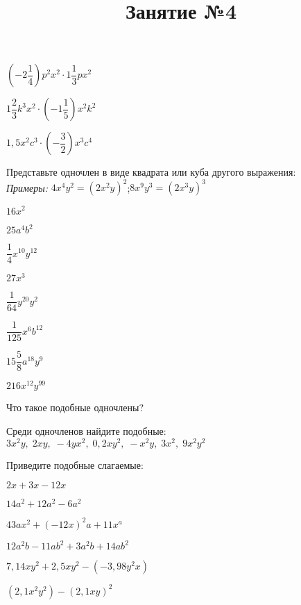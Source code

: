 \begin{listofex}
\begin{enumcols}[itemcolumns=2]
		\item \( \left( -2\dfrac{1}{4} \right)p^2x^2\cdot1\dfrac{1}{3}px^2 \)
		\item \( 1\dfrac{2}{3}k^3x^2\cdot\left( -1\dfrac{1}{5} \right)x^2k^2 \)
		\item \( 1,5x^2c^3\cdot\left( -\dfrac{3}{2} \right)x^3c^4 \)
	\end{enumcols}
	\item Представьте одночлен в виде квадрата или куба другого выражения:\\
	\textit{Примеры:} \( 4x^4y^2=(2x^2y)^2 \);\quad\( 8x^9y^3=(2x^3y)^3 \)
	\begin{enumcols}[itemcolumns=4]
		\item \( 16x^2 \)
		\item \( 25a^4b^2 \)
		\item \( \dfrac{1}{4}x^{10}y^{12} \)
		\item \( 27x^3 \)
		\item \( \dfrac{1}{64}y^{20}y^2 \)
		\item \( \dfrac{1}{125}x^6b^{12} \)
		\item \( 15\dfrac{5}{8}a^{18}y^9 \)
		\item \( 216x^{12}y^{99} \)
	\end{enumcols}
	\item Что такое подобные одночлены?
	\item Среди одночленов найдите подобные:\quad \( 3x^2y,\;2xy,\;-4yx^2,\;0,2xy^2,\;-x^2y,\;3x^2,\;9x^2y^2 \)
	\item Приведите подобные слагаемые:
	\begin{enumcols}[itemcolumns=2]
		\item \( 2x+3x-12x \)
		\item \( 14a^2+12a^2-6a^2 \)
		\item \( 43ax^2+(-12x)^2a+11x^a \)
		\item \( 12a^2b-11ab^2+3a^2b+14ab^2 \)
		\item \( 7,14xy^2+2,5xy^2-(-3,98y^2x) \)
		\item \( (2,1x^2y^2)-(2,1xy)^2 \)
	\end{enumcols}
\end{listofex}
\newpage
\title{Занятие №4}
